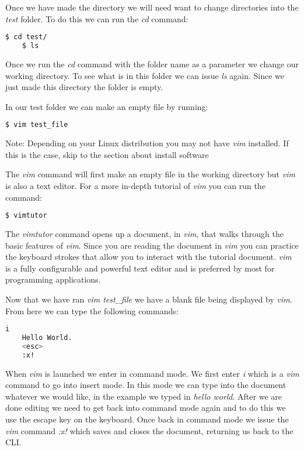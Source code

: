 Once we have made the directory we will need want to change directories into the \emph{test} folder. To do this we can run the \emph{cd} command:

\begin{lstlisting}[language=bash]  
    $ cd test/
	$ ls
\end{lstlisting}

Once we run the \emph{cd} command with the folder name as a parameter we change our working directory. To see what is in this folder we can issue \emph{ls} again. Since we just made this directory the folder is empty. 

In our test folder we can make an empty file by running:

\begin{lstlisting}[language=bash] 
    $ vim test_file
\end{lstlisting}

Note: Depending on your Linux distribution you may not have \emph{vim} installed. If this is the case, skip to the section about install software

The \emph{vim} command will first make an empty file in the working directory but \emph{vim} is also a text editor. For a more in-depth tutorial of \emph{vim} you can run the command:

\begin{lstlisting}[language=bash]  
    $ vimtutor
\end{lstlisting}

The \emph{vimtutor} command opens up a document, in \emph{vim}, that walks through the basic features of \emph{vim}. Since you are reading the document in \emph{vim} you can practice the keyboard strokes that allow you to interact with the tutorial document. \emph{vim} is a fully configurable and powerful text editor and is preferred by most for programming applications. 

Now that we have ran \emph{vim test\_file} we have a blank file being displayed by \emph{vim}. From here we can type the following commands:

\begin{lstlisting}[language=bash]
    i
    Hello World.
    <esc>
    :x!
\end{lstlisting}

When \emph{vim} is launched we enter in command mode. We first enter \emph{i} which is a \emph{vim} command to go into insert mode. In this mode we can type into the document whatever we would like, in the example we typed in \emph{hello world}. After we are done editing we need to get back into command mode again and to do this we use the escape key on the keyboard. Once back in command mode we issue the \emph{vim} command \emph{:x!} which saves and closes the document, returning us back to the \ac{CLI}.	
	
